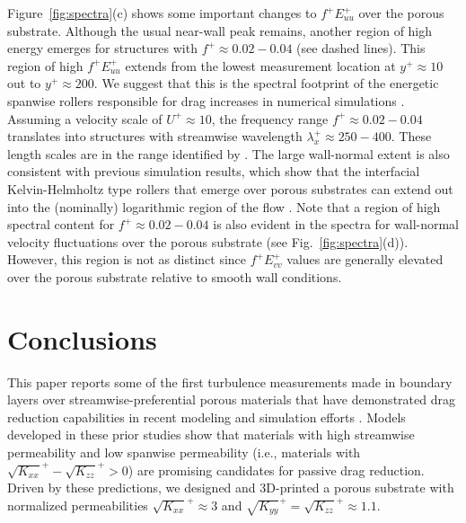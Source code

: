 \documentclass[letterpaper,11pt]{article}
\newcommand{\kpxx}{\sqrt{K_{xx}}^+}
\newcommand{\kpyy}{\sqrt{K_{yy}}^+}
\newcommand{\kpzz}{\sqrt{K_{zz}}^+}
\begin{document}
Figure~\ref{fig:spectra}(c) shows some important changes to $f^+ E_{uu}^+$ over the porous substrate.  Although the usual near-wall peak remains, another region of high energy emerges for structures with $f^+ \approx 0.02 - 0.04$ (see dashed lines).  This region of high $f^+ E_{uu}^+$ extends from the lowest measurement location at $y^+ \approx 10$ out to $y^+ \approx 200$.  We suggest that this is the spectral footprint of the energetic spanwise rollers responsible for drag increases in numerical simulations \citep{gomez2019turbulent}.  Assuming a velocity scale of $U^+ \approx 10$, the frequency range $f^+ \approx 0.02 - 0.04$ translates into structures with streamwise wavelength $\lambda_x^+ \approx 250-400$.  These length scales are in the range identified by \citet{gomez2019turbulent}. The large wall-normal extent is also consistent with previous simulation results, which show that the interfacial Kelvin-Helmholtz type rollers that emerge over porous substrates can extend out into the (nominally) logarithmic region of the flow \citep[e.g.,][]{breugem2006influence}.  Note that a region of high spectral content for $f^+ \approx 0.02 - 0.04$ is also evident in the spectra for wall-normal velocity fluctuations over the porous substrate (see Fig.~\ref{fig:spectra}(d)). However, this region is not as distinct since $f^+ E_{vv}^+$ values are generally elevated over the porous substrate relative to smooth wall conditions. 

\section{Conclusions}\label{sec:conclusions} 
This paper reports some of the first turbulence measurements made in boundary layers over streamwise-preferential porous materials that have demonstrated drag reduction capabilities in recent modeling and simulation efforts \citep{nabil_garcia_dragreduction,rosti2018turbulent,gomez2019turbulent}.  Models developed in these prior studies show that materials with high streamwise permeability and low spanwise permeability (i.e., materials with $\kpxx - \kpzz > 0$) are promising candidates for passive drag reduction.  Driven by these predictions, we designed and 3D-printed a porous substrate with normalized permeabilities $\kpxx \approx 3$ and $\kpyy = \kpzz \approx 1.1$.  
\end{document}
